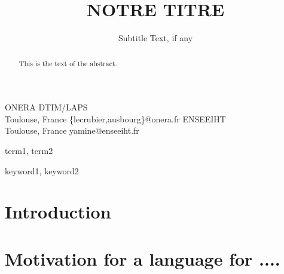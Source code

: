 \documentclass{sigplanconf}
\begin{document}
\setlength{\pdfpageheight}{\paperheight}
\setlength{\pdfpagewidth}{\paperwidth}






\title{NOTRE TITRE}
\subtitle{Subtitle Text, if any}

           {ONERA DTIM/LAPS \\
             Toulouse, France}
           {\{lecrubier,ausbourg\}@onera.fr}
           {ENSEEIHT \\
           Toulouse, France}
           {yamine@enseeiht.fr}

\maketitle

\begin{abstract}
This is the text of the abstract.
\end{abstract}


\terms
term1, term2

\keywords
keyword1, keyword2

\section{Introduction}


\section{Motivation      for      a       language      for      ....}

\end{document}
